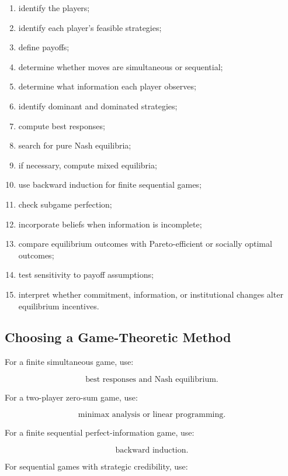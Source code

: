 \begin{enumerate}
    \item identify the players;
    \item identify each player's feasible strategies;
    \item define payoffs;
    \item determine whether moves are simultaneous or sequential;
    \item determine what information each player observes;
    \item identify dominant and dominated strategies;
    \item compute best responses;
    \item search for pure Nash equilibria;
    \item if necessary, compute mixed equilibria;
    \item use backward induction for finite sequential games;
    \item check subgame perfection;
    \item incorporate beliefs when information is incomplete;
    \item compare equilibrium outcomes with Pareto-efficient or socially
          optimal outcomes;
    \item test sensitivity to payoff assumptions;
    \item interpret whether commitment, information, or institutional
          changes alter equilibrium incentives.
\end{enumerate}

\subsection{Choosing a Game-Theoretic Method}
\label{subsec:choosing-game-method}

For a finite simultaneous game, use:

\[
\boxed{
\text{best responses and Nash equilibrium}.
}
\]

For a two-player zero-sum game, use:

\[
\boxed{
\text{minimax analysis or linear programming}.
}
\]

For a finite sequential perfect-information game, use:

\[
\boxed{
\text{backward induction}.
}
\]

For sequential games with strategic credibility, use:

